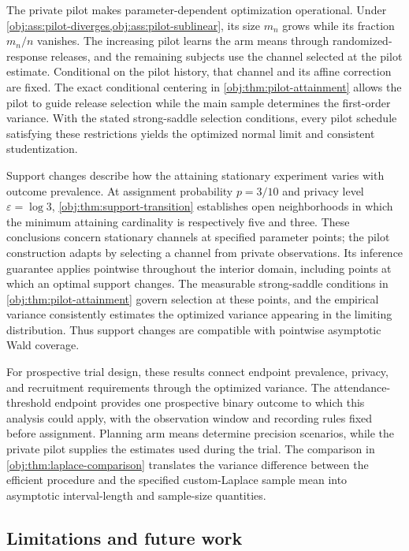 \documentclass[11pt]{article}
\begin{document}
The private pilot makes parameter-dependent optimization operational. Under \cref{obj:ass:pilot-diverges,obj:ass:pilot-sublinear}, its size \(m_n\) grows while its fraction \(m_n/n\) vanishes. The increasing pilot learns the arm means through randomized-response releases, and the remaining subjects use the channel selected at the pilot estimate. Conditional on the pilot history, that channel and its affine correction are fixed. The exact conditional centering in \cref{obj:thm:pilot-attainment} allows the pilot to guide release selection while the main sample determines the first-order variance. With the stated strong-saddle selection conditions, every pilot schedule satisfying these restrictions yields the optimized normal limit and consistent studentization.

Support changes describe how the attaining stationary experiment varies with outcome prevalence. At assignment probability \(p=3/10\) and privacy level \(\varepsilon=\log 3\), \cref{obj:thm:support-transition} establishes open neighborhoods in which the minimum attaining cardinality is respectively five and three. These conclusions concern stationary channels at specified parameter points; the pilot construction adapts by selecting a channel from private observations. Its inference guarantee applies pointwise throughout the interior domain, including points at which an optimal support changes. The measurable strong-saddle conditions in \cref{obj:thm:pilot-attainment} govern selection at these points, and the empirical variance consistently estimates the optimized variance appearing in the limiting distribution. Thus support changes are compatible with pointwise asymptotic Wald coverage.

For prospective trial design, these results connect endpoint prevalence, privacy, and recruitment requirements through the optimized variance. The attendance-threshold endpoint provides one prospective binary outcome to which this analysis could apply, with the observation window and recording rules fixed before assignment. Planning arm means determine precision scenarios, while the private pilot supplies the estimates used during the trial. The comparison in \cref{obj:thm:laplace-comparison} translates the variance difference between the efficient procedure and the specified custom-Laplace sample mean into asymptotic interval-length and sample-size quantities.

\subsection{Limitations and future work}
\end{document}
